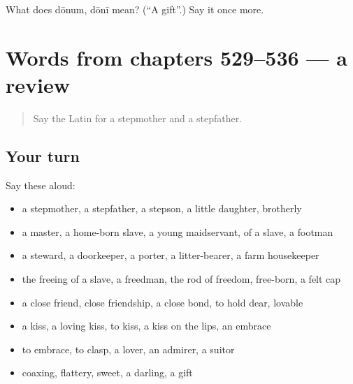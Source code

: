 \begin{tcolorbox}[breakable,colback=teal!4,colframe=teal!35!black,title={Before you move on}]
What does dōnum, dōnī mean? (\textquotedblleft{}A gift\textquotedblright{}.) Say it once more.
\end{tcolorbox}
\section[(dialogue)]{Words from chapters 529–536 — a review}

\label{lesson:LA-R536-review-529-536}



\begin{quote}
Say the Latin for a stepmother and a stepfather.
\end{quote}

\subsection*{Your turn}
Say these aloud:

\begin{itemize}
\raggedright
  \item a stepmother, a stepfather, a stepson, a little daughter, brotherly
  \item a master, a home-born slave, a young maidservant, of a slave, a footman
  \item a steward, a doorkeeper, a porter, a litter-bearer, a farm housekeeper
  \item the freeing of a slave, a freedman, the rod of freedom, free-born, a felt cap
  \item a close friend, close friendship, a close bond, to hold dear, lovable
  \item a kiss, a loving kiss, to kiss, a kiss on the lips, an embrace
  \item to embrace, to clasp, a lover, an admirer, a suitor
  \item coaxing, flattery, sweet, a darling, a gift
\end{itemize}

